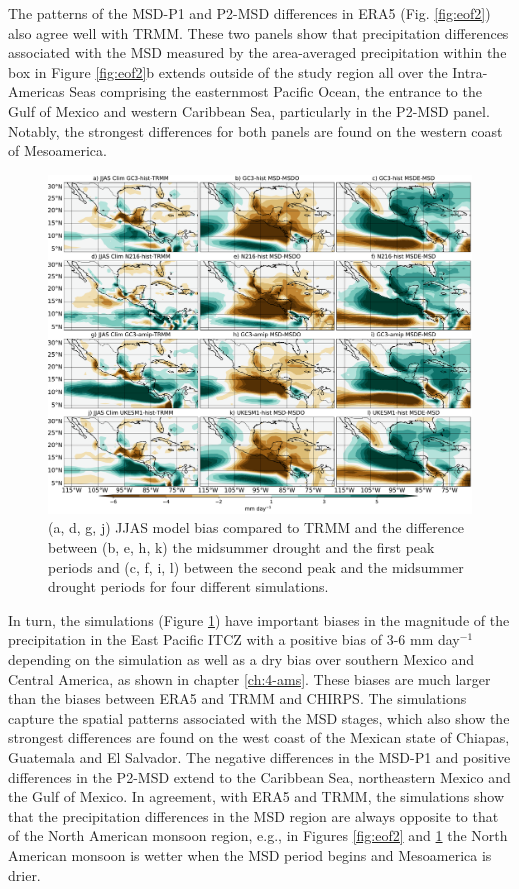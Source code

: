   The patterns of the MSD-P1 and P2-MSD differences in ERA5 (Fig. \ref{fig:eof2}) also agree well with TRMM. These two panels show that precipitation differences associated with the MSD measured by the area-averaged precipitation within the box in Figure \ref{fig:eof2}b extends outside of the study region all over the Intra-Americas Seas comprising the easternmost Pacific Ocean, the entrance to the Gulf of Mexico and western Caribbean Sea, particularly in the P2-MSD panel. Notably, the strongest differences for both panels are found on the western coast of Mesoamerica. 
 
 
\begin{figure}[t!]
\includegraphics[width=\linewidth]{figures/fig2obs_prmodels3}
\caption[Composite mean precipitation biases and seasonal variations]{ (a, d, g, j) JJAS model bias compared to TRMM and the difference between  (b, e, h, k)  the midsummer drought and the first peak periods and (c, f, i, l)  between the second peak and the midsummer drought periods for four different simulations.}
\label{fig:model_pr}
\end{figure} 
 
 In turn, the simulations (Figure \ref{fig:model_pr}) have important biases in the magnitude of the  precipitation in the East Pacific ITCZ with a positive bias of 3-6 mm day$^{-1}$ depending on the simulation as well as a dry bias over southern Mexico and Central America, as shown in chapter \ref{ch:4-ams}. These biases are much larger than the biases between ERA5 and TRMM and CHIRPS.
The simulations capture the spatial patterns associated with the MSD stages, which also show the strongest differences are found on the west coast of the Mexican state of Chiapas, Guatemala and El Salvador. The negative differences in the MSD-P1 and positive differences in the P2-MSD extend to the Caribbean Sea, northeastern Mexico and the Gulf of Mexico. 
In agreement, with ERA5 and TRMM, the simulations show that the precipitation differences in the MSD region are always opposite to that of the North American monsoon region, e.g., in Figures \ref{fig:eof2} and \ref{fig:model_pr} the North American monsoon is wetter when the MSD period begins and Mesoamerica is drier.
  
